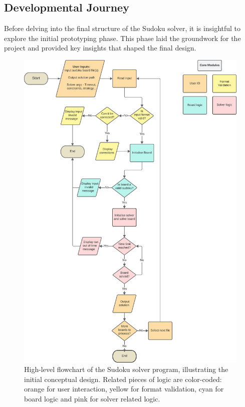 \documentclass[11pt]{article}
\begin{document}
\subsection{Developmental Journey}
Before delving into the final structure of the Sudoku solver, it is insightful to explore the initial prototyping phase. This phase laid the groundwork for the project and provided key insights that shaped the final design.

\begin{figure}[H]
\centering
\includegraphics[width=1\textwidth]{figs/solver_flowchart.png}
\caption{High-level flowchart of the Sudoku solver program, illustrating the initial conceptual design. Related pieces of logic are color-coded: orange for user interaction, yellow for format validation, cyan for board logic and pink for solver related logic.}


\label{fig:solver_flowchart}
\end{figure}
\end{document}
